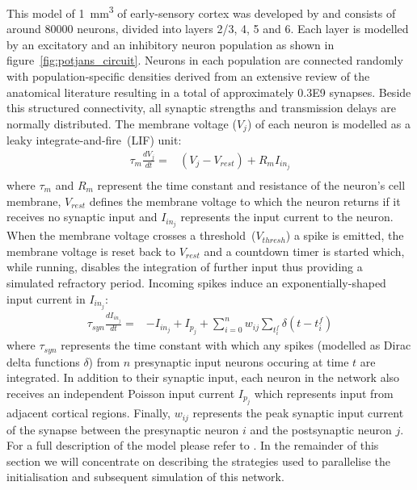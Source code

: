 \documentclass[utf8]{frontiersSCNS} %
\begin{document}
This model of \SI{1}{\milli\metre\cubed} of early-sensory cortex was developed by \citet{Potjans2012} and consists of around \num{80000} neurons, divided into layers 2/3, 4, 5 and 6.
Each layer is modelled by an excitatory and an inhibitory neuron population as shown in figure~\ref{fig:potjans_circuit}.
Neurons in each population are connected randomly with population-specific densities derived from an extensive review of the anatomical literature resulting in a total of approximately \num{0.3E9} synapses.
Beside this structured connectivity, all synaptic strengths and transmission delays are normally distributed.
The membrane voltage ($V_{j}$) of each neuron is modelled as a leaky integrate-and-fire~(LIF) unit:
%
\begin{align}
    \tau_{m} \frac{dV_{j}}{dt} = & (V_{j} - V_{rest}) + R_{m} I_{{in}_{j}} \label{eq:lif_neuron}\\
\end{align}
%
where $\tau_{m}$ and $R_{m}$ represent the time constant and resistance of the neuron's cell membrane, $V_{rest}$ defines the membrane voltage to which the neuron returns if it receives no synaptic input and $I_{{in}_{j}}$ represents the input current to the neuron.
When the membrane voltage crosses a threshold~($V_{thresh}$) a spike is emitted, the membrane voltage is reset back to $V_{rest}$ and a countdown timer is started which, while running, disables the integration of further input thus providing a simulated refractory period.
Incoming spikes induce an exponentially-shaped input current in $I_{{in}_{j}}$:
%
\begin{align}
    \tau_{syn} \frac{dI_{{in}_{j}}}{dt} = & -I_{{in}_{j}} + I_{p_{j}} + \sum_{i=0}^{n} w_{ij} \sum_{t_{i}^{f}}  \delta(t - t_{i}^{f})\label{eq:exp_neuron_input_current}
\end{align}
%
where $\tau_{syn}$ represents the time constant with which any spikes (modelled as Dirac delta functions $\delta$) from $n$ presynaptic input neurons occuring at time $t$ are integrated.
In addition to their synaptic input, each neuron in the network also receives an independent Poisson input current $I_{p_{j}}$ which represents input from adjacent cortical regions.
Finally, $w_{ij}$ represents the peak synaptic input current of the synapse between the presynaptic neuron $i$ and the postsynaptic neuron $j$.
For a full description of the model please refer to \citeauthor{Potjans2012}.
In the remainder of this section we will concentrate on describing the strategies used to parallelise the initialisation and subsequent simulation of this network.
\end{document}
